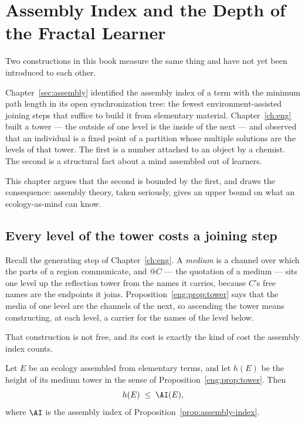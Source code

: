 \chapter{Assembly Index and the Depth of the Fractal Learner}
\label{sec:assembly-depth}

Two constructions in this book measure the same thing and have not yet
been introduced to each other.

Chapter~\ref{sec:assembly} identified the assembly index of a term with
the minimum path length in its open synchronization tree: the fewest
environment-assisted joining steps that suffice to build it from
elementary material.
Chapter~\ref{ch:eng} built a tower --- the outside of one level is the
inside of the next --- and observed that an individual is a fixed point
of a partition whose multiple solutions are the levels of that tower.
The first is a number attached to an object by a chemist.
The second is a structural fact about a mind assembled out of learners.

This chapter argues that the second is bounded by the first, and draws
the consequence: assembly theory, taken seriously, gives an upper bound
on what an ecology-as-mind can know.

\section{Every level of the tower costs a joining step}

Recall the generating step of Chapter~\ref{ch:eng}.
A \emph{medium} is a channel over which the parts of a region
communicate, and $@C$ --- the quotation of a medium --- sits one level up
the reflection tower from the names it carries, because $C$'s free names
are the endpoints it joins.
Proposition~\ref{eng:prop:tower} says that the media of one level are the
channels of the next, so ascending the tower means constructing, at each
level, a carrier for the names of the level below.

That construction is not free, and its cost is exactly the kind of cost
the assembly index counts.

\begin{proposition}
\label{prop:tower-ai}
Let $E$ be an ecology assembled from elementary terms, and let $h(E)$ be
the height of its medium tower in the sense of
Proposition~\ref{eng:prop:tower}.
Then
\[
  h(E) \;\leq\; \AI(E),
\]
where $\AI$ is the assembly index of Proposition~\ref{prop:assembly-index}.
\end{proposition}


